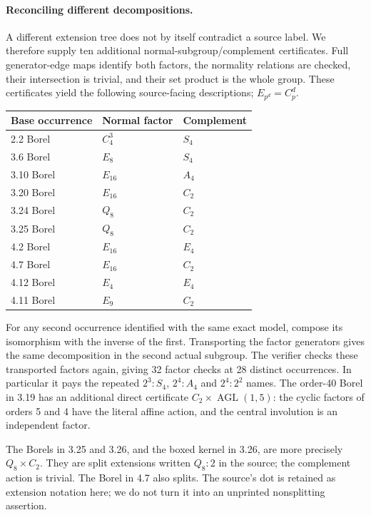 \documentclass[11pt]{article}
\begin{document}
\newpage
\paragraph{Reconciling different decompositions.}
A different extension tree does not by itself contradict a source label.
We therefore supply ten additional normal-subgroup/complement
certificates. Full generator-edge maps identify both factors, the
normality relations are checked, their intersection is trivial, and
their set product is the whole group. These certificates yield the
following source-facing descriptions; $E_{p^d}=C_p^d$.
\begin{center}\small
\begin{tabular}{lll}\toprule
Base occurrence & Normal factor & Complement\\\midrule
2.2 Borel & $C_4^3$ & $S_4$\\
3.6 Borel & $E_8$ & $S_4$\\
3.10 Borel & $E_{16}$ & $A_4$\\
3.20 Borel & $E_{16}$ & $C_2$\\
3.24 Borel & $Q_8$ & $C_2$\\
3.25 Borel & $Q_8$ & $C_2$\\
4.2 Borel & $E_{16}$ & $E_4$\\
4.7 Borel & $E_{16}$ & $C_2$\\
4.12 Borel & $E_4$ & $E_4$\\
4.11 Borel & $E_9$ & $C_2$\\\bottomrule
\end{tabular}\end{center}
For any second occurrence identified with the same exact model, compose
its isomorphism with the inverse of the first. Transporting the factor
generators gives the same decomposition in the second actual subgroup.
The verifier checks these transported factors again, giving 32 factor
checks at 28 distinct occurrences. In particular it pays the repeated
$2^3:S_4$, $2^4:A_4$ and $2^4:2^2$ names. The order-40 Borel in 3.19
has an additional direct certificate $C_2\times\operatorname{AGL}(1,5)$:
the cyclic factors of orders 5 and 4 have the literal affine action,
and the central involution is an independent factor.

The Borels in 3.25 and 3.26, and the boxed kernel in 3.26, are more
precisely $Q_8\times C_2$. They are split extensions written $Q_8:2$
in the source; the complement action is trivial. The Borel in 4.7
also splits. The source's dot is retained as extension notation here;
we do not turn it into an unprinted nonsplitting assertion.
\end{document}
